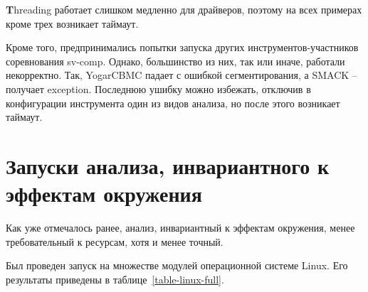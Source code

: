 

{\textbf Threading} работает слишком медленно для драйверов, поэтому на всех примерах кроме трех возникает таймаут.

Кроме того, предпринимались попытки запуска других инструментов-участников соревнования sv-comp. 
Однако, большинство из них, так или иначе, работали некорректно. 
Так, YogarCBMC падает с ошибкой сегментирования, а SMACK -- получает exception. Последнюю ушибку можно избежать, отключив в конфигурации инструмента один из видов анализа, но после этого возникает таймаут.


\section{Запуски анализа, инвариантного к эффектам окружения}

Как уже отмечалось ранее, анализ, инвариантный к эффектам окружения, менее требовательный к ресурсам, хотя и менее точный.

Был проведен запуск на множестве модулей операционной системе Linux. Его результаты приведены в таблице~\ref{table-linux-full}.

